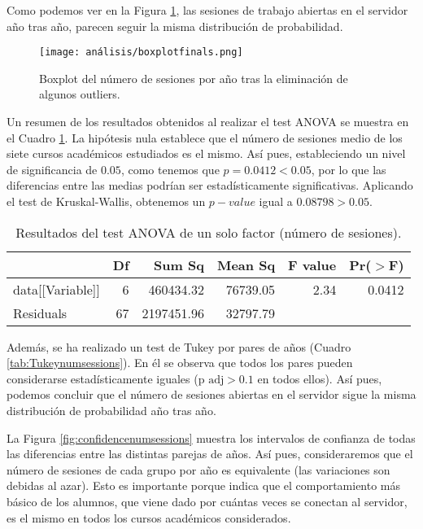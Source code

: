 Como podemos ver en la Figura \ref{fig:boxplotsessionsyear}, las sesiones de trabajo abiertas en el servidor año tras año, parecen seguir la misma distribución de probabilidad.

\begin{figure}[H]
    \centering
    \texttt{[image: análisis/boxplotfinals.png]}
    \caption{Boxplot del número de sesiones por año tras la eliminación de algunos outliers.}
    \label{fig:boxplotsessionsyear}
\end{figure}

Un resumen de los resultados obtenidos al realizar el test ANOVA se muestra en el Cuadro \ref{tab:ANOVAnumsessions}. La hipótesis nula establece que el número de sesiones medio de los siete cursos académicos estudiados es el mismo. Así pues, estableciendo un nivel de significancia de $0.05$, como tenemos que $p = 0.0412 < 0.05$, por lo que las diferencias entre las medias podrían ser estadísticamente significativas. Aplicando el test de Kruskal-Wallis, obtenemos un $p-value$ igual a $0.08798 > 0.05$.

\begin{table}[H]
\centering
\caption{Resultados del test ANOVA de un solo factor (número de sesiones).}
\label{tab:ANOVAnumsessions}
\begin{tabular}{lrrrrr}
  \hline
 & Df & Sum Sq & Mean Sq & F value & Pr($>$F) \\ 
  \hline
data[[Variable]] & 6 & 460434.32 & 76739.05 & 2.34 & 0.0412 \\ 
  Residuals         & 67 & 2197451.96 & 32797.79 &  &  \\ 
   \hline
\end{tabular}
\end{table}

Además, se ha realizado un test de Tukey por pares de años (Cuadro \ref{tab:Tukeynumsessions}). En él se observa que todos los pares pueden considerarse estadísticamente iguales ($\text{p adj} > 0.1$ en todos ellos). Así pues, podemos concluir que el número de sesiones abiertas en el servidor sigue la misma distribución de probabilidad año tras año.

La Figura \ref{fig:confidencenumsessions} muestra los intervalos de confianza de todas las diferencias entre las distintas parejas de años. Así pues, consideraremos que el número de sesiones de cada grupo por año es equivalente (las variaciones son debidas al azar). Esto es importante porque indica que el comportamiento más básico de los alumnos, que viene dado por cuántas veces se conectan al servidor, es el mismo en todos los cursos académicos considerados.

